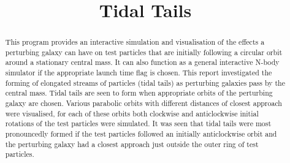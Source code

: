 \documentclass[10pt,a4paper]{article}
\begin{document}
\begin{titlingpage}
\title{Tidal Tails}
\author{}
\maketitle
\begin{abstract}
This program provides an interactive simulation and visualisation of the effects a perturbing galaxy can have on test particles that are initially following a circular orbit around a stationary central mass. It can also function as a general interactive N-body simulator if the appropriate launch time flag is chosen. This report investigated the forming of elongated streams of particles (tidal tails) as perturbing galaxies pass by the central mass. Tidal tails are seen to form when appropriate orbits of the perturbing galaxy are chosen. Various parabolic orbits with different distances of closest approach were visualised, for each of these orbits both clockwise and anticlockwise initial rotations of the test particles were simulated. It was seen that tidal tails were most pronouncedly formed if the test particles followed an initially anticlockwise orbit and the perturbing galaxy had a closest approach just outside the outer ring of test particles.
\end{abstract}
	
\end{titlingpage}

\clearpage
\end{document}

